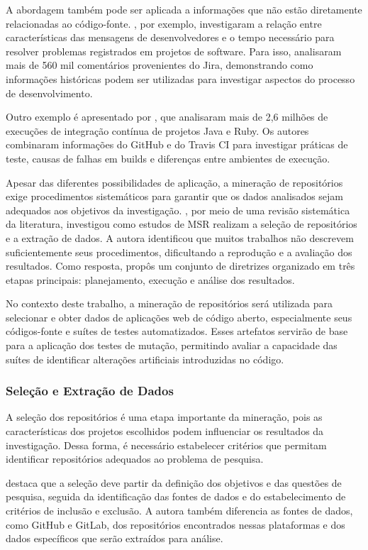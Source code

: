 A abordagem também pode ser aplicada a informações que não estão diretamente relacionadas ao código-fonte. , por exemplo, investigaram a relação entre características das mensagens de desenvolvedores e o tempo necessário para resolver problemas registrados em projetos de software. Para isso, analisaram mais de 560 mil comentários provenientes do Jira, demonstrando como informações históricas podem ser utilizadas para investigar aspectos do processo de desenvolvimento.

Outro exemplo é apresentado por , que analisaram mais de 2,6 milhões de execuções de integração contínua de projetos Java e Ruby. Os autores combinaram informações do GitHub e do Travis CI para investigar práticas de teste, causas de falhas em builds e diferenças entre ambientes de execução.

Apesar das diferentes possibilidades de aplicação, a mineração de repositórios exige procedimentos sistemáticos para garantir que os dados analisados sejam adequados aos objetivos da investigação. , por meio de uma revisão sistemática da literatura, investigou como estudos de MSR realizam a seleção de repositórios e a extração de dados. A autora identificou que muitos trabalhos não descrevem suficientemente seus procedimentos, dificultando a reprodução e a avaliação dos resultados. Como resposta, propôs um conjunto de diretrizes organizado em três etapas principais: planejamento, execução e análise dos resultados.

No contexto deste trabalho, a mineração de repositórios será utilizada para selecionar e obter dados de aplicações web de código aberto, especialmente seus códigos-fonte e suítes de testes automatizados. Esses artefatos servirão de base para a aplicação dos testes de mutação, permitindo avaliar a capacidade das suítes de identificar alterações artificiais introduzidas no código.

\subsubsection{Seleção e Extração de Dados}

A seleção dos repositórios é uma etapa importante da mineração, pois as características dos projetos escolhidos podem influenciar os resultados da investigação. Dessa forma, é necessário estabelecer critérios que permitam identificar repositórios adequados ao problema de pesquisa.

 destaca que a seleção deve partir da definição dos objetivos e das questões de pesquisa, seguida da identificação das fontes de dados e do estabelecimento de critérios de inclusão e exclusão. A autora também diferencia as fontes de dados, como GitHub e GitLab, dos repositórios encontrados nessas plataformas e dos dados específicos que serão extraídos para análise.

